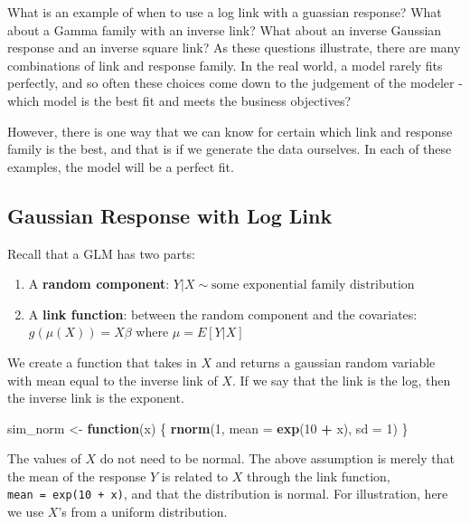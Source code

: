 \documentclass[openany]{book}
\newenvironment{Shaded}{\begin{snugshade}}{\end{snugshade}}
\newcommand{\ControlFlowTok}[1]{\textcolor[rgb]{0.13,0.29,0.53}{\textbf{#1}}}
\newcommand{\DataTypeTok}[1]{\textcolor[rgb]{0.13,0.29,0.53}{#1}}
\newcommand{\DecValTok}[1]{\textcolor[rgb]{0.00,0.00,0.81}{#1}}
\newcommand{\KeywordTok}[1]{\textcolor[rgb]{0.13,0.29,0.53}{\textbf{#1}}}
\newcommand{\NormalTok}[1]{#1}
\newcommand{\OperatorTok}[1]{\textcolor[rgb]{0.81,0.36,0.00}{\textbf{#1}}}
\newcommand{\StringTok}[1]{\textcolor[rgb]{0.31,0.60,0.02}{#1}}
\begin{document}
What is an example of when to use a log link with a guassian response? What about a Gamma family with an inverse link? What about an inverse Gaussian response and an inverse square link? As these questions illustrate, there are many combinations of link and response family. In the real world, a model rarely fits perfectly, and so often these choices come down to the judgement of the modeler - which model is the best fit and meets the business objectives?

However, there is one way that we can know for certain which link and response family is the best, and that is if we generate the data ourselves. In each of these examples, the model will be a perfect fit.

\hypertarget{gaussian-response-with-log-link}{%
\subsection{Gaussian Response with Log Link}\label{gaussian-response-with-log-link}}

Recall that a GLM has two parts:

\begin{enumerate}
\def\labelenumi{\arabic{enumi}.}
\item
  A \textbf{random component}: \(Y|X \sim \text{some exponential family distribution}\)
\item
  A \textbf{link function}: between the random component and the covariates: \(g(\mu(X)) = X\beta\) where \(\mu = E[Y|X]\)
\end{enumerate}

We create a function that takes in \(X\) and returns a gaussian random variable with mean equal to the inverse link of \(X\). If we say that the link is the log, then the inverse link is the exponent.

\begin{Shaded}
\begin{Highlighting}[]
\NormalTok{sim_norm <-}\StringTok{ }\ControlFlowTok{function}\NormalTok{(x) \{}
  \KeywordTok{rnorm}\NormalTok{(}\DecValTok{1}\NormalTok{, }\DataTypeTok{mean =} \KeywordTok{exp}\NormalTok{(}\DecValTok{10} \OperatorTok{+}\StringTok{ }\NormalTok{x), }\DataTypeTok{sd =} \DecValTok{1}\NormalTok{)}
\NormalTok{\}}
\end{Highlighting}
\end{Shaded}

The values of \(X\) do not need to be normal. The above assumption is merely that the mean of the response \(Y\) is related to \(X\) through the link function, \texttt{mean\ =\ exp(10\ +\ x)}, and that the distribution is normal. For illustration, here we use \(X\)'s from a uniform distribution.
\end{document}
